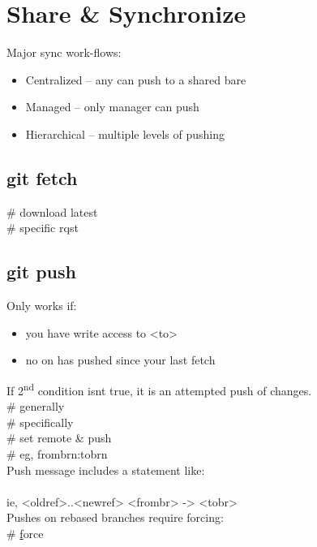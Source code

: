 \section{Share \& Synchronize}
Major sync work-flows:
\begin{itemize}
    \item Centralized -- any can push to a shared bare
    \item Managed -- only manager can push
    \item Hierarchical -- multiple levels of pushing
\end{itemize}


\subsection*{git fetch}
 \# download latest \\
 \# specific rqst


\subsection*{git push}
Only works if: \begin{itemize}[partopsep=0pt,topsep=0pt,parsep=0pt]
    \item you have write access to <to>
    \item no on has pushed since your last fetch
\end{itemize}
If 2\textsuperscript{nd} condition isn\textquotesingle t true, it is an attempted push of  changes.\\
 \# generally \\
 \# specifically \\
 \# set remote \& push\\
 \# eg, frombrn:tobrn \\
Push message includes a statement like:\\
\\
ie, <oldref>..<newref> <frombr> -> <tobr>\\
Pushes on rebased branches require forcing:\\
 \# \underline{f}orce


